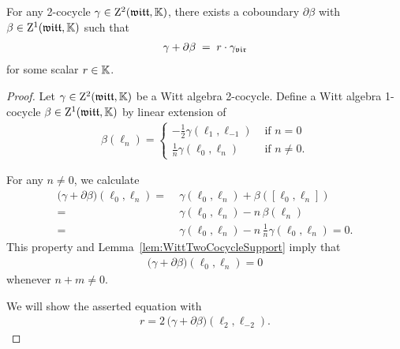 \begin{lemma}
  \label{lem:WittTwoCocycleNormalization}
  \leanok
  For any 2-cocycle $\gamma \in \mathrm{Z}^2(\mathfrak{witt},\mathbb{K})$, there exists
  a coboundary $\partial \beta$ with $\beta \in \mathrm{Z}^1(\mathfrak{witt},\mathbb{K})$
  such that
  \begin{align*}
    \gamma + \partial \beta \; = \; r \cdot {\gamma}_{\mathfrak{vir}}
  \end{align*}
  for some scalar $r \in \mathbb{K}$.
\end{lemma}
\begin{proof}
  \leanok
  Let $\gamma \in \mathrm{Z}^2(\mathfrak{witt},\mathbb{K})$ be a Witt algebra 2-cocycle.
  Define a Witt algebra 1-cocycle $\beta \in \mathrm{Z}^1(\mathfrak{witt},\mathbb{K})$ by linear extension of
  \begin{align*}
    \beta (\ell_n) =
    \begin{cases}
      -\frac{1}{2} \gamma(\ell_1, \ell_{-1}) & \text{ if } n = 0 \\
      \frac{1}{n} \gamma(\ell_0, \ell_n) & \text{ if } n \ne 0 .
    \end{cases}
  \end{align*}

  For any $n \ne 0$, we calculate
  \begin{align*}
           \big( \gamma + \partial \beta \big) (\ell_0 , \ell_n)
    = \; & \gamma (\ell_0 , \ell_n) + \beta ([\ell_0,\ell_n]) \\
    = \; & \gamma (\ell_0 , \ell_n) - n \, \beta (\ell_n) \\
    = \; & \gamma (\ell_0 , \ell_n) - n \, \frac{1}{n}\gamma(\ell_0, \ell_n) = 0 .
  \end{align*}
  This property and Lemma~\ref{lem:WittTwoCocycleSupport} imply that
  \begin{align*}
    \big( \gamma + \partial \beta \big) (\ell_0 , \ell_n) = 0
  \end{align*}
  whenever $n+m \ne 0$.

  We will show the asserted equation with
  \begin{align*}
    r = 2 \, \big( \gamma + \partial \beta \big) ( \ell_2, \ell_{-2}) .
  \end{align*}


\end{proof}
